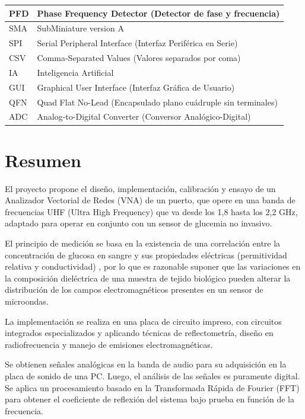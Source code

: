 \documentclass[11pt,a4paper, table, dvipsnames]{report}
\numberwithin{equation}{section}
\begin{document}
\begin{center}
\begin{tabularx}{\textwidth}{|X|X|}
\hline
PFD & Phase Frequency Detector (Detector de fase y frecuencia) \\
\hline
SMA & SubMiniature version A\\
\hline
SPI & Serial Peripheral Interface (Interfaz Periférica en Serie)\\
\hline
CSV & Comma-Separated Values (Valores separados por coma)\\
\hline
IA & Inteligencia Artificial\\
\hline
GUI & Graphical User Interface (Interfaz Gráfica de Usuario)\\
\hline
QFN & Quad Flat No-Lead (Encapsulado plano cuádruple sin terminales) \\
\hline
ADC & Analog-to-Digital Converter (Conversor Analógico-Digital)\\
\hline

\end{tabularx}
\end{center}



\chapter*{Resumen}

El proyecto propone el diseño, implementación, calibración y ensayo de un Analizador Vectorial de Redes (VNA) de un puerto, que opere en una banda de frecuencias UHF (Ultra High Frequency) que va desde los 1,8 hasta los 2,2 GHz, adaptado para operar en conjunto con un sensor de glucemia no invasivo.

El principio de medición se basa en la existencia de una correlación entre la concentración de glucosa en sangre y sus propiedades eléctricas (permitividad relativa y conductividad) \cite{Topsakal}, por lo que es razonable suponer que las variaciones en la composición dieléctrica de una muestra de tejido biológico pueden alterar la distribución de los campos electromagnéticos presentes en un sensor de microondas.

La implementación se realiza en una placa de circuito impreso, con circuitos integrados especializados y aplicando técnicas de reflectometría, diseño en radiofrecuencia y manejo de emisiones electromagnéticas.

Se obtienen señales analógicas en la banda de audio para su adquisición en la placa de sonido de una PC. Luego, el análisis de las señales es puramente digital. Se aplica un procesamiento basado en la Transformada Rápida de Fourier (FFT) para obtener el coeficiente de reflexión del sistema bajo prueba en función de la frecuencia.
 
\end{document}
